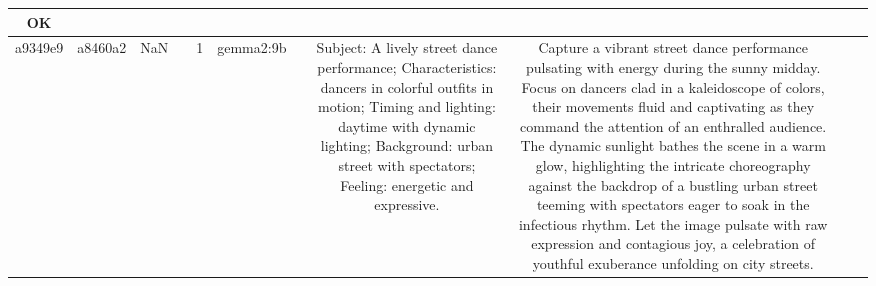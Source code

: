 \begin{table}[h!]
\begin{tabular}{|c|c|c|c|c|c|c|c|c|c|c|}
OK\\
\hline
a9349e9 & a8460a2 & NaN &  & 1 & gemma2:9b &  & Subject: A lively street dance performance; Characteristics: dancers in colorful outfits in motion; Timing and lighting: daytime with dynamic lighting; Background: urban street with spectators; Feeling: energetic and expressive. & Capture a vibrant street dance performance pulsating with energy during the sunny midday. Focus on dancers clad in a kaleidoscope of colors, their movements fluid and captivating as they command the attention of an enthralled audience. The dynamic sunlight bathes the scene in a warm glow, highlighting the intricate choreography against the backdrop of a bustling urban street teeming with spectators eager to soak in the infectious rhythm.  Let the image pulsate with raw expression and contagious joy, a celebration of youthful exuberance unfolding on city streets.   



\end{tabular}
\end{table}
